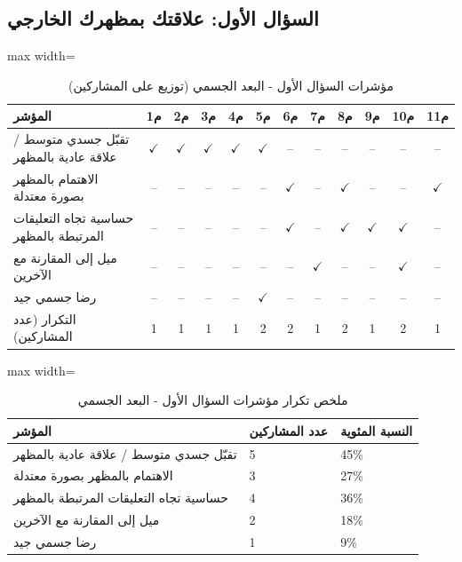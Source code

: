 \documentclass[12pt,oneside]{report}
\begin{document}
\subsection{السؤال الأول: علاقتك بمظهرك الخارجي}
\begin{table}[H]
\centering
\caption{مؤشرات السؤال الأول - البعد الجسمي (توزيع على المشاركين)}
\scriptsize
\renewcommand{\arraystretch}{1.3}
\setlength{\tabcolsep}{4pt}
\begin{adjustbox}{max width=\textwidth}
\begin{tabular}{l c c c c c c c c c c c}
\toprule
\textbf{المؤشر} & \textbf{م1} & \textbf{م2} & \textbf{م3} & \textbf{م4} & \textbf{م5} & \textbf{م6} & \textbf{م7} & \textbf{م8} & \textbf{م9} & \textbf{م10} & \textbf{م11} \\
\midrule
تقبّل جسدي متوسط / علاقة عادية بالمظهر & $\checkmark$ & $\checkmark$ & $\checkmark$ & $\checkmark$ & $\checkmark$ & -- & -- & -- & -- & -- & -- \\
الاهتمام بالمظهر بصورة معتدلة & -- & -- & -- & -- & -- & $\checkmark$ & -- & $\checkmark$ & -- & -- & $\checkmark$ \\
حساسية تجاه التعليقات المرتبطة بالمظهر & -- & -- & -- & -- & -- & $\checkmark$ & -- & $\checkmark$ & $\checkmark$ & $\checkmark$ & -- \\
ميل إلى المقارنة مع الآخرين & -- & -- & -- & -- & -- & -- & $\checkmark$ & -- & -- & $\checkmark$ & -- \\
رضا جسمي جيد & -- & -- & -- & -- & $\checkmark$ & -- & -- & -- & -- & -- & -- \\
التكرار (عدد المشاركين) & 1 & 1 & 1 & 1 & 2 & 2 & 1 & 2 & 1 & 2 & 1 \\
\bottomrule
\end{tabular}
\end{adjustbox}
\end{table}
\begin{table}[H]
\centering
\caption{ملخص تكرار مؤشرات السؤال الأول - البعد الجسمي}
\small
\renewcommand{\arraystretch}{1.3}
\setlength{\tabcolsep}{4pt}
\begin{adjustbox}{max width=\textwidth}
\begin{tabular}{p{6cm} p{4cm} p{4cm}}
\toprule
\textbf{المؤشر} & \textbf{عدد المشاركين} & \textbf{النسبة المئوية} \\
\midrule
تقبّل جسدي متوسط / علاقة عادية بالمظهر & 5 & 45\% \\
الاهتمام بالمظهر بصورة معتدلة & 3 & 27\% \\
حساسية تجاه التعليقات المرتبطة بالمظهر & 4 & 36\% \\
ميل إلى المقارنة مع الآخرين & 2 & 18\% \\
رضا جسمي جيد & 1 & 9\% \\
\bottomrule
\end{tabular}
\end{adjustbox}
\end{table}
\end{document}
